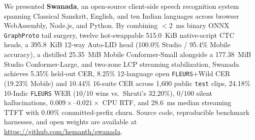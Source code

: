 \documentclass[10pt,twocolumn]{article}
\begin{document}
We presented \textbf{Swanada}, an open-source client-side speech recognition system spanning Classical Sanskrit, English, and ten Indian languages across browser WebAssembly, Node.js, and Python. By combining $< 2$~ms binary ONNX \texttt{GraphProto} tail surgery, twelve hot-swappable 515.0~KiB native-script CTC heads, a 395.8~KiB 12-way Auto-LID head (100.0\% Studio / 95.4\% Mobile accuracy), a distilled 25.35~MiB Mobile Conformer-Small alongside a 177.38~MiB Studio Conformer-Large, and two-zone LCP streaming stabilization, Swanada achieves 5.35\% held-out CER, 8.25\% 12-language open \texttt{FLEURS}+Wild CER (19.23\% Mobile) and 10.44\% 16-suite CER across 1,600 public \texttt{test} clips, 24.18\% 10-Indic \texttt{FLEURS} WER ($10/10$ wins vs.\ Shruti's 32.20\%), $0/100$ silent hallucinations, $0.009\times$--$0.021\times$ CPU RTF, and 28.6~ms median streaming TTFT with 0.00\% committed-prefix churn. Source code, reproducible benchmark harnesses, and open weights are available at \url{https://github.com/hemanth/swanada}.

{\small
\let\oldthebibliography\thebibliography
\renewcommand{\thebibliography}[1]{%
  \oldthebibliography{#1}%
  \setlength{\itemsep}{1pt}%
  \setlength{\parskip}{0pt}%
}


}
\end{document}
